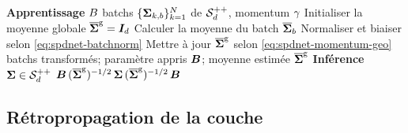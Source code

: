 \begin{figure}[p]
  \begin{center}
    \makebox[\textwidth][c]{}
  \end{center}
  \caption{%
  }
  \label{fig:spdnet-batchnorm}
\end{figure}

\begin{algorithm}[htb]
  \caption{Normalisation par batch pour \SPDnet}
  \label{algo:spdnet-batchnorm}
  \begin{algorithmic}[1]
    \Statex\hspace*{-\algorithmicindent}\textbf{Apprentissage}
    \Require $B$ batchs $\{\boldsymbol{\Sigma}_{k,b}\}_{k=1}^{N}$ de $\mathcal{S}_{d}^{++}$, momentum $\gamma$
    \State Initialiser la moyenne globale $\overline{\boldsymbol{\Sigma}}^{\mathrm{g}}=\boldsymbol{I}_{d}$
      \State Calculer la moyenne du batch $\overline{\boldsymbol{\Sigma}}_b$
      \State Normaliser et biaiser selon \cref{eq:spdnet-batchnorm}
      \State Mettre à jour $\overline{\boldsymbol{\Sigma}}^{\mathrm{g}}$ selon \cref{eq:spdnet-momentum-geo}
    \EndFor
    \Ensure batchs transformés; paramètre appris $\boldsymbol{B}$; moyenne estimée $\overline{\boldsymbol{\Sigma}}^{\mathrm{g}}$
    \Statex\hspace*{-\algorithmicindent}\textbf{Inférence}
    \Require $\boldsymbol{\Sigma}\in\mathcal{S}_{d}^{++}$
    \Ensure $\boldsymbol{B}\,(\overline{\boldsymbol{\Sigma}}^{\mathrm{g}})^{-1/2}\,\boldsymbol{\Sigma}\,(\overline{\boldsymbol{\Sigma}}^{\mathrm{g}})^{-1/2}\,\boldsymbol{B}$
  \end{algorithmic}
\end{algorithm}

\subsection{Rétropropagation de la couche}
\label{sec:spdnet-batchnorm-backprop}

